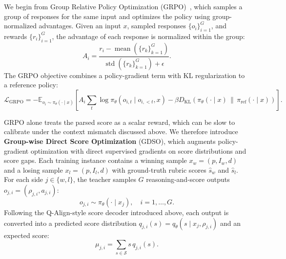 \documentclass{llmxive}
\providecommand{\KL}{D_{\mathrm{KL}}}
\providecommand{\teaname}{GDSO\xspace}
\begin{document}
We begin from Group Relative Policy Optimization (GRPO)~\cite{deepseek-math}, which samples a group of responses for the same input and optimizes the policy using group-normalized advantages. Given an input $x$, sampled responses $\{o_i\}_{i=1}^{G}$, and rewards $\{r_i\}_{i=1}^{G}$, the advantage of each response is normalized within the group:
\begin{equation}
A_i = \frac{r_i - \operatorname{mean}(\{r_k\}_{k=1}^{G})}
{\operatorname{std}(\{r_k\}_{k=1}^{G}) + \epsilon}.
\label{eq:grpo-advantage}
\end{equation}
The GRPO objective combines a policy-gradient term with KL regularization to a reference policy:
\begin{equation}
\mathcal{L}_{\mathrm{GRPO}}
=
-\mathbb{E}_{o_i \sim \pi_\theta(\cdot \mid x)}
\left[
A_i \sum_t \log \pi_\theta(o_{i,t} \mid o_{i,<t},x)
- \beta \KL\!\left(\pi_\theta(\cdot \mid x)\,\|\,\pi_{\mathrm{ref}}(\cdot \mid x)\right)
\right].
\label{eq:grpo-objective}
\end{equation}

GRPO alone treats the parsed score as a scalar reward, which can be slow to calibrate under the context mismatch discussed above. We therefore introduce \textbf{Group-wise Direct Score Optimization} (\teaname), which augments policy-gradient optimization with direct supervised gradients on score distributions and score gaps. Each training instance contains a winning sample $x_w=(p,I_w,d)$ and a losing sample $x_l=(p,I_l,d)$ with ground-truth rubric scores $\hat{s}_w$ and $\hat{s}_l$. For each side $j \in \{w,l\}$, the teacher samples $G$ reasoning-and-score outputs $o_{j,i}=(\rho_{j,i},a_{j,i})$:
\begin{equation}
o_{j,i} \sim \pi_\theta(\cdot \mid x_j), \quad i=1,\ldots,G.
\label{eq:gdso-sampling}
\end{equation}
Following the Q-Align-style score decoder introduced above, each output is converted into a predicted score distribution $q_{j,i}(s)=q_\theta(s\mid x_j,\rho_{j,i})$ and an expected score:
\begin{equation}
\mu_{j,i} = \sum_{s \in \mathcal{S}} s \, q_{j,i}(s).
\label{eq:parsed-score}
\end{equation}
\end{document}
